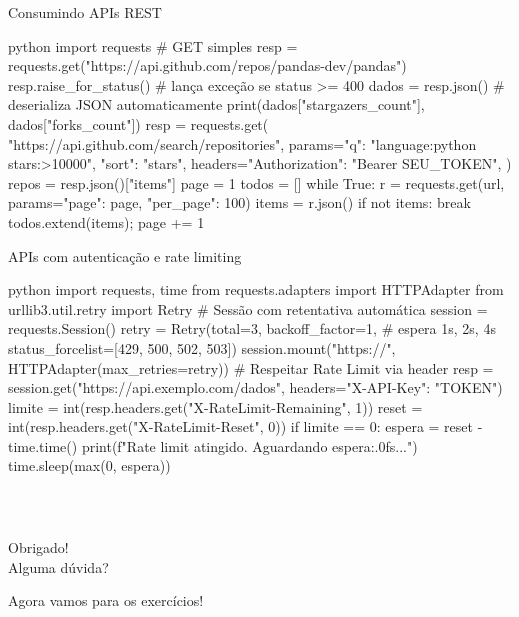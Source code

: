 \documentclass[xcolor=dvipsnames,t,aspectratio=169]{beamer}
\newcommand{\highlight}[1]{{\color{nes_dark_orange} #1}}
\begin{document}
\begin{frame}[c, fragile]{Consumindo APIs REST}

\begin{code}{python}
import requests
# GET simples
resp = requests.get("https://api.github.com/repos/pandas-dev/pandas")
resp.raise_for_status()          # lança exceção se status >= 400
dados = resp.json()              # deserializa JSON automaticamente
print(dados["stargazers_count"], dados["forks_count"])
resp = requests.get(
    "https://api.github.com/search/repositories",
    params={"q": "language:python stars:>10000", "sort": "stars"},
    headers={"Authorization": "Bearer SEU_TOKEN"},
)
repos = resp.json()["items"]
page = 1
todos = []
while True:
    r = requests.get(url, params={"page": page, "per_page": 100})
    items = r.json()
    if not items: break
    todos.extend(items); page += 1
\end{code}

\end{frame}


\begin{frame}[c, fragile]{APIs com autenticação e rate limiting}

\begin{code}{python}
import requests, time
from requests.adapters import HTTPAdapter
from urllib3.util.retry import Retry
# Sessão com retentativa automática
session = requests.Session()
retry = Retry(total=3,
              backoff_factor=1,          # espera 1s, 2s, 4s
              status_forcelist=[429, 500, 502, 503])
session.mount("https://", HTTPAdapter(max_retries=retry))
# Respeitar Rate Limit via header
resp = session.get("https://api.exemplo.com/dados",
                   headers={"X-API-Key": "TOKEN"})
limite  = int(resp.headers.get("X-RateLimit-Remaining", 1))
reset   = int(resp.headers.get("X-RateLimit-Reset", 0))
if limite == 0:
    espera = reset - time.time()
    print(f"Rate limit atingido. Aguardando {espera:.0f}s...")
    time.sleep(max(0, espera))
\end{code}

\end{frame}



\begin{frame}
    \frametitle{~}
        \vfill
        \begin{center}
            {\Huge Obrigado!}\vspace{1.5em}\\
            {\Large \highlight{Alguma dúvida?}}\\
        \end{center}
        \vfill
        \begin{center}
            {\small Agora vamos para os exercícios!}
        \end{center}
\end{frame}
\end{document}
